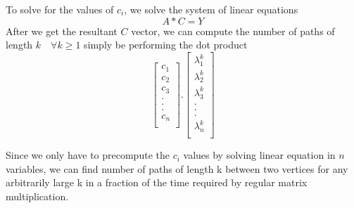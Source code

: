 \documentclass[12pt, a4paper]{article}
\begin{document}
\begin{flushleft}
    To solve for the values of $c_i$, we solve the system of linear equations
      $$A*C=Y$$
      After we get the resultant $C$ vector, we can compute the number of paths of length $k \quad \forall k \ge 1$ simply be performing the dot product
      \begin{equation*}
        \begin{bmatrix}
        c_1 \\
        c_2 \\
        c_3 \\
        . \\
        . \\
        . \\
        c_n \\
        \end{bmatrix}
        .
        \begin{bmatrix}
        \lambda_1^k \\
        \lambda_2^k \\
        \lambda_3^k \\
        . \\
        . \\
        . \\
        \lambda_n^k \\
        \end{bmatrix}
      \end{equation*}

    Since we only have to precompute the $c_i$ values by solving linear equation in $n$ variables, we can find number of paths of length k between two vertices for any arbitrarily large k in a fraction of the time required by regular matrix multiplication. 


\end{flushleft}
\end{document}
